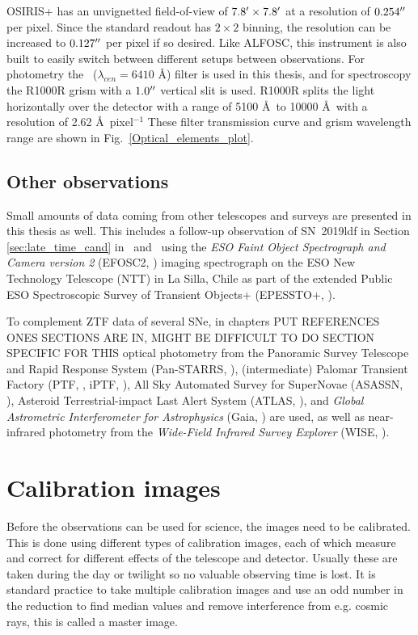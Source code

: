 \documentclass[a4paper,oneside,12pt, class=Latex/Classes/PhDthesisPSnPDF, crop=false]{standalone}
\begin{document}
OSIRIS+ has an unvignetted field-of-view of $7.8^{\prime}\times7.8^{\prime}$ at a resolution of $0.254^{\prime\prime}$ per pixel. Since the standard readout has $2\times2$ binning, the resolution can be increased to $0.127^{\prime\prime}$ per pixel if so desired. Like ALFOSC, this instrument is also built to easily switch between different setups between observations. For photometry the \ztfr~($\lambda_{cen} =6410$ \AA) filter is used in this thesis, and for spectroscopy the R1000R grism with a $1.0^{\prime\prime}$ vertical slit is used. R1000R splits the light horizontally over the detector with a range of 5100 \AA\ to 10000 \AA\ with a resolution of 2.62 \AA\ pixel$^{-1}$ These filter transmission curve and grism wavelength range are shown in Fig.~\ref{Optical_elements_plot}.


\subsection{Other observations}
Small amounts of data coming from other telescopes and surveys are presented in this thesis as well. This includes a follow-up observation of SN~2019ldf in Section \ref{sec:late_time_cand} in \ztfg\ and \ztfr\ using the \textit{ESO Faint Object Spectrograph and Camera version 2} (EFOSC2, \citealt{EFOSC2}) imaging spectrograph on the ESO New Technology Telescope (NTT) in La Silla, Chile as part of the extended Public ESO Spectroscopic Survey of Transient Objects+ (EPESSTO+, \citealt{PESSTO}).

To complement ZTF data of several SNe, in chapters \color{red} PUT REFERENCES ONES SECTIONS ARE IN, MIGHT BE DIFFICULT TO DO SECTION SPECIFIC FOR THIS \color{black} optical photometry from the Panoramic Survey Telescope and Rapid Response System (Pan-STARRS, \citealt{Pan-STARRS1}), (intermediate) Palomar Transient Factory (PTF, \citealt{PTF_1, PTF_2}, iPTF, \citealt{iPTF}), All Sky Automated Survey for SuperNovae (ASASSN, \citealt{ASASSN_paper1, ASASSN_catalog}), Asteroid Terrestrial-impact Last Alert System (ATLAS, \citealt{ATLAS}),  and \textit{Global Astrometric Interferometer for Astrophysics} (Gaia, \citealt{Gaia}) are used, as well as near-infrared photometry from the \textit{Wide-Field Infrared Survey Explorer} (WISE, \citealt{WISE}).


\section{Calibration images}
\label{calibration}
Before the observations can be used for science, the images need to be calibrated. This is done using different types of calibration images, each of which measure and correct for different effects of the telescope and detector. Usually these are taken during the day or twilight so no valuable observing time is lost. It is standard practice to take multiple calibration images and use an odd number in the reduction to find median values and remove interference from e.g. cosmic rays, this is called a master image.
\end{document}
